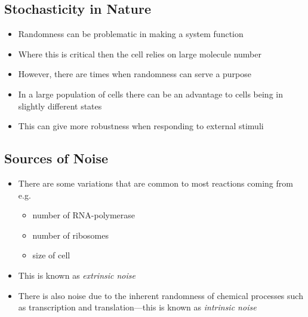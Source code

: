 
\begin{slide}
\section{Stochasticity in Nature}

\begin{PauseHighLight}
  \begin{itemize}
  \item Randomness can be problematic in making a system function\pause
  \item Where this is critical then the cell relies on large molecule
    number\pause
  \item However, there are times when randomness can serve a
    purpose\pause
  \item In a large population of cells there can be an advantage to
    cells being in slightly different states\pause
  \item This can give more robustness when responding to external
    stimuli\pause
  \end{itemize}
\end{PauseHighLight}

\end{slide}


\begin{slide}
\section{Sources of Noise}

\begin{PauseHighLight}
  \begin{itemize}
  \item There are some variations that are common to most reactions
    coming from e.g.
    \begin{itemize}\squeeze
    \item number of RNA-polymerase 
    \item number of ribosomes
    \item size of cell
    \end{itemize}
  \item This is known as \emph{extrinsic noise}\pause
  \item There is also noise due to the inherent randomness of chemical
    processes such as transcription and translation---this is known as
    \emph{intrinsic noise}\pause
  \end{itemize}
\end{PauseHighLight}

\end{slide}


